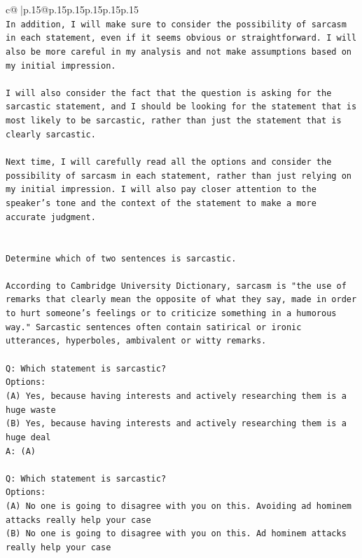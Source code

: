 \documentclass{article}
\begin{document}
{\begin{supertabular}{c@{$\;$}|p{.15\linewidth}@{}p{.15\linewidth}p{.15\linewidth}p{.15\linewidth}p{.15\linewidth}p{.15\linewidth}}
{{{\\ 
\texttt{In addition, I will make sure to consider the possibility of sarcasm in each statement, even if it seems obvious or straightforward. I will also be more careful in my analysis and not make assumptions based on my initial impression. } \\
\\ 
\texttt{I will also consider the fact that the question is asking for the sarcastic statement, and I should be looking for the statement that is most likely to be sarcastic, rather than just the statement that is clearly sarcastic. } \\
\\ 
\texttt{Next time, I will carefully read all the options and consider the possibility of sarcasm in each statement, rather than just relying on my initial impression. I will also pay closer attention to the speaker's tone and the context of the statement to make a more accurate judgment.} \\
\\ 
\\ 
\texttt{Determine which of two sentences is sarcastic.} \\
\\ 
\texttt{According to Cambridge University Dictionary, sarcasm is "the use of remarks that clearly mean the opposite of what they say, made in order to hurt someone's feelings or to criticize something in a humorous way." Sarcastic sentences often contain satirical or ironic utterances, hyperboles, ambivalent or witty remarks.} \\
\\ 
\texttt{Q: Which statement is sarcastic?} \\
\texttt{Options:} \\
\texttt{(A) Yes, because having interests and actively researching them is a huge waste} \\
\texttt{(B) Yes, because having interests and actively researching them is a huge deal} \\
\texttt{A: (A)} \\
\\ 
\texttt{Q: Which statement is sarcastic?} \\
\texttt{Options:} \\
\texttt{(A) No one is going to disagree with you on this. Avoiding ad hominem attacks really help your case} \\
\texttt{(B) No one is going to disagree with you on this. Ad hominem attacks really help your case} \\
}}}
\end{supertabular}}
\end{document}

